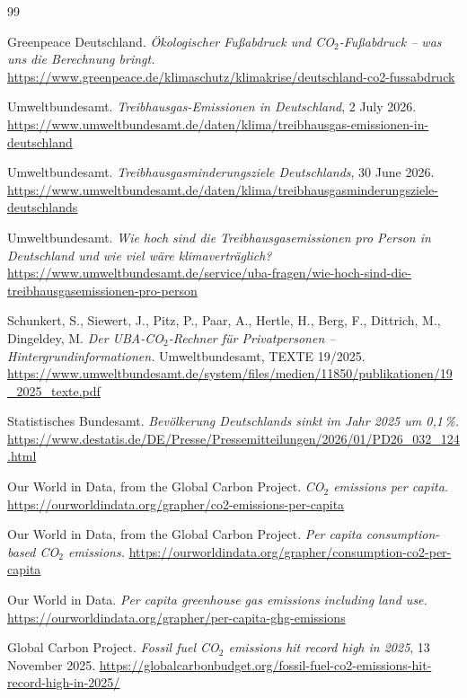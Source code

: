 \documentclass[11pt,a4paper]{article}
\begin{document}
\begin{thebibliography}{99}
\footnotesize

 Greenpeace Deutschland. \emph{Ökologischer Fußabdruck und CO$_2$-Fußabdruck -- was uns die Berechnung bringt.} \url{https://www.greenpeace.de/klimaschutz/klimakrise/deutschland-co2-fussabdruck}

 Umweltbundesamt. \emph{Treibhausgas-Emissionen in Deutschland}, 2 July 2026. \url{https://www.umweltbundesamt.de/daten/klima/treibhausgas-emissionen-in-deutschland}

 Umweltbundesamt. \emph{Treibhausgasminderungsziele Deutschlands}, 30 June 2026. \url{https://www.umweltbundesamt.de/daten/klima/treibhausgasminderungsziele-deutschlands}

 Umweltbundesamt. \emph{Wie hoch sind die Treibhausgasemissionen pro Person in Deutschland und wie viel wäre klimaverträglich?} \url{https://www.umweltbundesamt.de/service/uba-fragen/wie-hoch-sind-die-treibhausgasemissionen-pro-person}

 Schunkert, S., Siewert, J., Pitz, P., Paar, A., Hertle, H., Berg, F., Dittrich, M., Dingeldey, M. \emph{Der UBA-CO$_2$-Rechner für Privatpersonen -- Hintergrundinformationen.} Umweltbundesamt, TEXTE 19/2025. \url{https://www.umweltbundesamt.de/system/files/medien/11850/publikationen/19_2025_texte.pdf}

 Statistisches Bundesamt. \emph{Bevölkerung Deutschlands sinkt im Jahr 2025 um 0,1\,\%.} \url{https://www.destatis.de/DE/Presse/Pressemitteilungen/2026/01/PD26_032_124.html}

 Our World in Data, from the Global Carbon Project. \emph{CO$_2$ emissions per capita.} \url{https://ourworldindata.org/grapher/co2-emissions-per-capita}

 Our World in Data, from the Global Carbon Project. \emph{Per capita consumption-based CO$_2$ emissions.} \url{https://ourworldindata.org/grapher/consumption-co2-per-capita}

 Our World in Data. \emph{Per capita greenhouse gas emissions including land use.} \url{https://ourworldindata.org/grapher/per-capita-ghg-emissions}

 Global Carbon Project. \emph{Fossil fuel CO$_2$ emissions hit record high in 2025}, 13 November 2025. \url{https://globalcarbonbudget.org/fossil-fuel-co2-emissions-hit-record-high-in-2025/}


\end{thebibliography}
\end{document}

